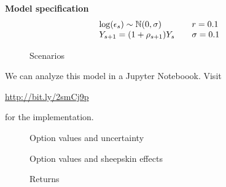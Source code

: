 \begin{frame}\textbf{Model specification}
\begin{align*}\begin{array}{l@{\qquad}l}
\log(\epsilon_s) \sim \N(0, \sigma) & r = 0.1   \\
Y_{s + 1} = (1 + \rho_{s + 1}) Y_s & \sigma = 0.1 \\
\end{array}\end{align*}
\end{frame}
\begin{frame}
\begin{figure}[htp]\centering
\caption{Scenarios}
\end{figure}
\end{frame}
\begin{frame}
We can analyze this model in a Jupyter Noteboook. Visit
\begin{center}
\url{http://bit.ly/2smCj9p}
\end{center}
for the implementation.
\end{frame}
\begin{frame}
\begin{figure}[htp]\centering
\caption{Option values and uncertainty}
\end{figure}
\end{frame}
\begin{frame}
\begin{figure}[htp]\centering
\caption{Option values and sheepskin effects}
\end{figure}
\end{frame}
\begin{frame}
\begin{figure}[htp]\centering
\caption{Returns}
\end{figure}
\end{frame}
